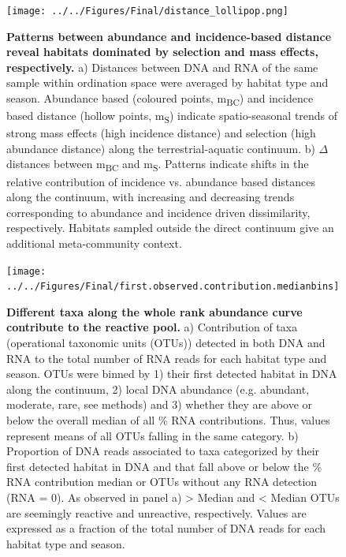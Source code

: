 \documentclass[12pt,a4paper]{article} %
\begin{document}
\begin{figure}[!ht]
\centering
\texttt{[image: ../../Figures/Final/distance\_lollipop.png]}
\caption{\textbf{Patterns between abundance and incidence-based distance reveal habitats dominated by selection and mass effects, respectively.} a) Distances between DNA and RNA of the same sample within ordination space were averaged by habitat type and season. Abundance based (coloured points, m\textsubscript{BC}) and incidence based distance (hollow points, m\textsubscript{S}) indicate spatio-seasonal trends of strong mass effects (high incidence distance) and selection (high abundance distance) along the terrestrial-aquatic continuum. b) $\Delta$ distances between m\textsubscript{BC} and m\textsubscript{S}. Patterns indicate shifts in the relative contribution of incidence vs. abundance based distances along the continuum, with increasing and decreasing trends corresponding to abundance and incidence driven dissimilarity, respectively. Habitats sampled outside the direct continuum give an additional meta-community context.}
\end{figure}

\begin{figure}[!ht]
\centering
\texttt{[image: ../../Figures/Final/first.observed.contribution.medianbins]}
\caption{\textbf{Different taxa along the whole rank abundance curve contribute to the reactive pool.} a) Contribution of taxa (operational taxonomic units (OTUs)) detected in both DNA and RNA to the total number of RNA reads for each habitat type and season. OTUs were binned by 1) their first detected habitat in DNA along the continuum, 2) local DNA abundance (e.g. abundant, moderate, rare, see methods) and 3) whether they are above or below the overall median of all \% RNA contributions. Thus, values represent means of all OTUs falling in the same category. b) Proportion of DNA reads associated to taxa categorized by their first detected habitat in DNA and that fall above or below the \% RNA contribution median or OTUs without any RNA detection (RNA = 0). As observed in panel a) > Median and < Median OTUs are seemingly reactive and unreactive, respectively. Values are expressed as a fraction of the total number of DNA reads for each habitat type and season.}
\end{figure}
\end{document}
